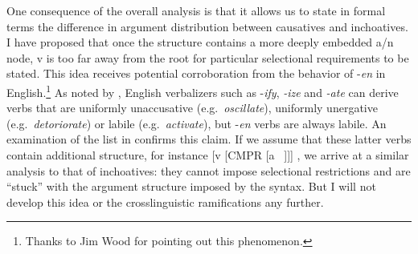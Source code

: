 \begin{exe}
\begin{xlist}
\begin{xlist}
\begin{exe}
\begin{exe}
\begin{xlist}
\begin{exe}
\begin{xlist}
\begin{exe}
\begin{xlist}
\begin{xlist}
\begin{exe}
\begin{xlist}
\begin{exe}
\begin{xlist}
\begin{exe}
\begin{exe}
\begin{exe}
\begin{xlist}
\begin{exe}
\begin{exe}
\begin{xlist}
\begin{xlist}
\begin{exe}
\begin{xlist}
\begin{exe}
\begin{exe}
\begin{exe}
\begin{xlist}
\begin{exe}
\begin{exe}
\begin{xlist}
\begin{exe}
\begin{xlist}
\begin{exe}
\begin{xlist}
\begin{exe}
\begin{xlist}
\begin{exe}
\begin{exe}
\begin{xlist}
\begin{exe}
\begin{exe}
\begin{xlist}
\begin{xlist}
\begin{exe}
\begin{xlist}
\begin{xlist}
\begin{exe}
\begin{xlist}
\begin{exe}
\begin{xlist}
\begin{exe}
\begin{xlist}
\begin{exe}
\begin{xlist}
\begin{exe}
\begin{exe}
\begin{exe}
\begin{exe}
\begin{xlist}
\begin{exe}
\begin{exe}
\begin{xlist}
\begin{xlist}
One consequence of the overall analysis is that it allows us to state in formal terms the difference in argument distribution between causatives and inchoatives. 
I have proposed that once the structure contains a more deeply embedded a/n node, v is too far away from the root for particular selectional requirements to be stated. This idea receives potential corroboration from the behavior of -\emph{en} in English.\footnote{Thanks to Jim Wood for pointing out this phenomenon.} As noted by \cite{harley09n}, English verbalizers such as -\emph{ify}, \emph{-ize} and \emph{-ate} can derive verbs that are uniformly unaccusative (e.g.~\emph{oscillate}), uniformly unergative (e.g.~\emph{detoriorate}) or labile (e.g.~\emph{activate}), but -\emph{en} verbs are always labile. An examination of the list in \citet[245]{levin93} confirms this claim. If we assume that these latter verbs contain additional structure, for instance [v [CMPR [a ~\!]]] \citep{bobaljik12}, we arrive at a similar analysis to that of {\thif} inchoatives: they cannot impose selectional restrictions and are ``stuck'' with the argument structure imposed by the syntax. But I will not develop this idea or the crosslinguistic ramifications any further.


\end{xlist}
\end{xlist}
\end{exe}
\end{exe}
\end{xlist}
\end{exe}
\end{exe}
\end{exe}
\end{exe}
\end{xlist}
\end{exe}
\end{xlist}
\end{exe}
\end{xlist}
\end{exe}
\end{xlist}
\end{exe}
\end{xlist}
\end{xlist}
\end{exe}
\end{xlist}
\end{xlist}
\end{exe}
\end{exe}
\end{xlist}
\end{exe}
\end{exe}
\end{xlist}
\end{exe}
\end{xlist}
\end{exe}
\end{xlist}
\end{exe}
\end{xlist}
\end{exe}
\end{exe}
\end{xlist}
\end{exe}
\end{exe}
\end{exe}
\end{xlist}
\end{exe}
\end{xlist}
\end{xlist}
\end{exe}
\end{exe}
\end{xlist}
\end{exe}
\end{exe}
\end{exe}
\end{xlist}
\end{exe}
\end{xlist}
\end{exe}
\end{xlist}
\end{xlist}
\end{exe}
\end{xlist}
\end{exe}
\end{xlist}
\end{exe}
\end{exe}
\end{xlist}
\end{xlist}
\end{exe}
